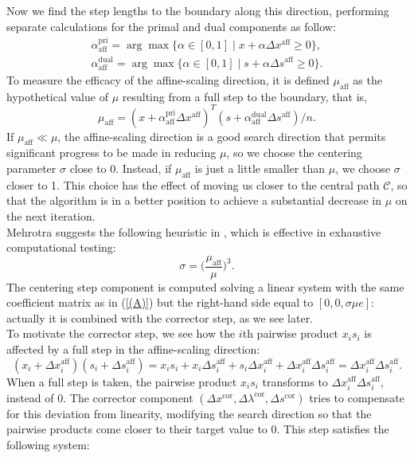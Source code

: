 \documentclass[a4paper,10 pt,titlepage,twoside]{book}
\theoremstyle{plain}
\theoremstyle{definition}
\theoremstyle{remark}
\begin{document}
Now we find the step lengths to the boundary along this direction, performing separate calculations for the primal and dual components as follow:
\begin{align}\label{Qw}\tag{4.22a}
\alpha_{\text{aff}}^{\text{pri}}=\arg\max\{\alpha\in[0,1]\;|\;x +\alpha\Delta x^{\text{aff}}\geq 0\}, \\
\alpha_{\text{aff}}^{\text{dual}}=\arg\max\{\alpha\in[0,1]\;|\;s +\alpha\Delta s^{\text{aff}}\geq 0\}\tag{4.22b}.
\end{align}
To measure the efficacy of the affine-scaling direction, it is defined $\mu_{\text{aff}}$ as the hypothetical value of $\mu$ resulting from a full step to the boundary, that is,
\begin{equation}\tag{4.22c}
	\mu_{\text{aff}}= (x+\alpha_{\text{aff}}^{\text{pri}}\Delta x^{\text{aff}})^{T}(s+\alpha_{\text{aff}}^{\text{dual}}\Delta s^{\text{aff}})/n.
\end{equation}
If $\mu_{\text{aff}}\ll\mu$, the affine-scaling direction is a good search direction that permits significant progress to be made in reducing $\mu$, so we choose the centering parameter $\sigma$ close to 0. Instead, if $\mu_{\text{aff}}$ is just a little smaller than $\mu$, we choose $\sigma$ closer to 1. This choice has the effect of moving us closer  to the central path $\mathcal{C}$, so that the algorithm is in a better position to achieve a substantial decrease in $\mu$ on the next iteration.\\
Mehrotra suggests the following heuristic in \cite{MER}, which is effective in exhaustive computational testing:
\begin{equation*}\label{CP}
\sigma = \bigg(\frac{\mu_{\text{aff}}}{\mu}\bigg)^{3}.
\end{equation*}
The centering step component is computed solving a linear system with the same coefficient matrix as in (\ref{(A)}) but the right-hand side equal to $[0, 0,\sigma\mu e]$: actually it is combined with the corrector step, as we see later.\\
To motivate the corrector step, we see how the $i$th pairwise product $x_{i}s_{i}$ is affected by a full step in the affine-scaling direction:
\begin{equation*}
(x_{i}+\Delta x_{i}^{\text{aff}})(s_{i}+\Delta s_{i}^{\text{aff}})= x_{i}s_{i}+ x_{i}\Delta s_{i}^{\text{aff}}+s_{i}\Delta x_{i}^{\text{aff}}+\Delta x_{i}^{\text{aff}}\Delta s_{i}^{\text{aff}} =\Delta x_{i}^{\text{aff}}\Delta s_{i}^{\text{aff}}.
\end{equation*}
When a full step is taken, the pairwise product $x_{i}s_{i}$ transforms to $\Delta x_{i}^{\text{aff}}\Delta s_{i}^{\text{aff}}$, instead of 0. The corrector component $(\Delta x^{\text{cor}}, \Delta \lambda^{\text{cor}}, \Delta s^{\text{cor}})$ tries to compensate for this deviation from linearity, modifying the search direction so that the pairwise products come closer to their target value to 0. This step satisfies the following system:
\end{document}
